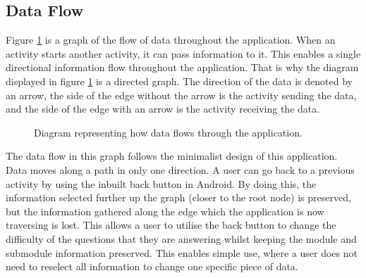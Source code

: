 \documentclass{article}
\begin{document}
\subsection{Data Flow}

Figure \ref{figure:applicationDataFlow} is a graph of the flow of data throughout the application. When an activity starts another activity, it can pass information to it. This enables a single directional information flow throughout the application. That is why the diagram displayed in figure \ref{figure:applicationDataFlow} is a directed graph. The direction of the data is denoted by an arrow, the side of the edge without the arrow is the activity sending the data, and the side of the edge with an arrow is the activity receiving the data. 

\begin{figure}[H]
	\centering
	\caption{Diagram representing how data flows through the application.}
	\label{figure:applicationDataFlow}
\end{figure}

The data flow in this graph follows the minimalist design of this application. Data moves along a path in only one direction. A user can go back to a previous activity by using the inbuilt back button in Android. By doing this, the information selected further up the graph (closer to the root node) is preserved, but the information gathered along the edge which the application is now traversing is lost. This allows a user to utilise the back button to change the difficulty of the questions that they are answering whilst keeping the module and submodule information preserved. This enables simple use, where a user does not need to reselect all information to change one specific piece of data. \par
\end{document}
